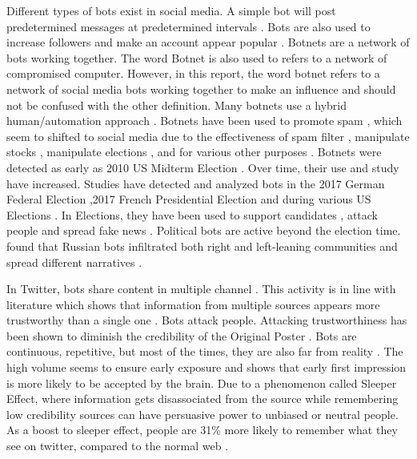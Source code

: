 \documentclass[letterpaper]{article}
\begin{document}
Different types of bots exist in social media. A simple bot will post predetermined messages at predetermined intervals \cite{haustein2016tweets}. Bots are also used to increase followers
and make an account appear popular \cite{cresci2015fame}. Botnets are a network of bots working together. The word Botnet is also used to refers to a network of compromised computer. However, in this report, 
the word botnet refers to a network of social media bots working together to make an influence and should not be confused with the other definition. Many botnets use a hybrid human/automation 
approach \cite{grimme2018changing}. Botnets have been used to promote spam \cite{ferrara2018measuring}, which seem to shifted to social media due to the effectiveness of spam filter \cite{gao2010detecting,chu2012detecting,ferrara2018measuring}, 
manipulate stocks \cite{ferrara2015manipulation}, manipulate elections \cite{morstatter2018alt}, 
and for various other purposes \cite{abokhodair2015dissecting}.
Botnets were detected as early as 2010 US Midterm Election \cite{mitter2014categorization}. Over time, their use and study have increased. 
Studies have detected and analyzed bots in the 2017 German Federal Election \cite{morstatter2018alt} ,2017 French Presidential Election \cite{ferrara2017disinformation} and during 
various US Elections \cite{mitter2014categorization,bovet2019influence,rizoiu2018debatenight,bessi2016social,howard2018algorithms,howard2016bots,deb2019perils}. In Elections, 
they have been used to support candidates \cite{luceri2019red}, attack people \cite{mueller_investigation} and spread fake news \cite{vosoughi2018spread,grinberg2019fake}. 
Political bots are active beyond the election time. \cite{stewart2018examining} found that Russian bots infiltrated both right and left-leaning communities and spread different narratives 
\cite{mueller_investigation}. \par

In Twitter, bots share content 
in multiple channel \cite{paul2016russian}. This activity is in line with literature which shows that information from multiple sources appears more trustworthy than a single one \cite{harkins1981multiple}. 
 Bots attack people. Attacking trustworthiness has been shown to diminish the credibility of the Original Poster \cite{pornpitakpan2004persuasiveness}. 
Bots are continuous, repetitive, but most of the times, they are also far from reality \cite{paul2016russian}. The high volume seems to ensure early exposure and \cite{petty1994think} shows that early
 first impression is more likely to be accepted by the brain. Due to a phenomenon called Sleeper Effect, where information gets disassociated from the source while remembering \cite{underwood1998memory,paul2016russian}
 low credibility sources can have persuasive power to unbiased or neutral people. As a boost to sleeper effect, people are 31\% more likely to remember what they see on twitter, 
 compared to the normal web \cite{twitter_remember}. \par
\end{document}
